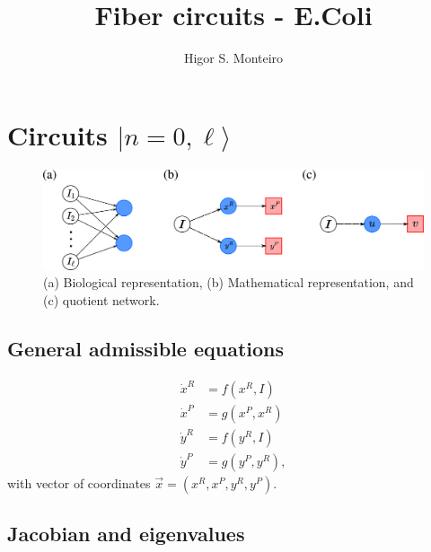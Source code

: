 \documentclass[12pt]{article}
\begin{document}
\title{Fiber circuits - E.Coli}
\author{Higor S. Monteiro}

\maketitle

\section{Circuits $|n=0, \ell \rangle$}

\begin{figure}[H]
    \centering
    \includegraphics[scale=0.5]{figs/n0l_1.png}
    \caption{(a) Biological representation, 
        (b) Mathematical representation, and (c) quotient
        network.}
    \label{fig:fig1}
\end{figure}

\subsection{General admissible equations}

\begin{equation} \label{eq:n0_gen_eq}
    \begin{aligned}
        \dot{x}^R &= f(x^R, I)\\
        \dot{x}^P &= g(x^P, x^R)\\
        \dot{y}^R &= f(y^R, I)\\
        \dot{y}^P &= g(y^P, y^R),
    \end{aligned}
\end{equation}
with vector of coordinates $\vec{x} = (x^R, x^P, y^R, y^P)$.

\subsection{Jacobian and eigenvalues}
\end{document}
